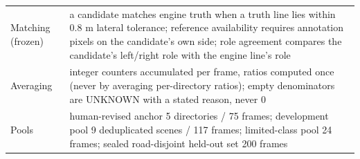 \documentclass[journal]{IEEEtran}
\begin{document}
\begin{table}[!t]
\begin{tabular}{@{}ll@{}}
Matching (frozen) & a candidate matches engine truth when a truth line lies within 0.8 m lateral tolerance; reference availability requires annotation pixels on the candidate's own side; role agreement compares the candidate's left/right role with the engine line's role \\
Averaging & integer counters accumulated per frame, ratios computed once (never by averaging per-directory ratios); empty denominators are UNKNOWN with a stated reason, never 0 \\
Pools & human-revised anchor 5 directories / 75 frames; development pool 9 deduplicated scenes / 117 frames; limited-class pool 24 frames; sealed road-disjoint held-out set 200 frames \\
\bottomrule
\end{tabular}
\end{table}
\end{document}
